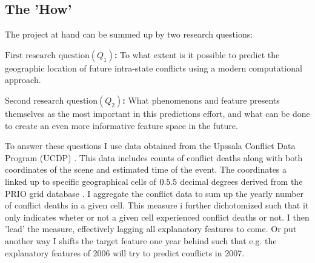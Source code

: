 \documentclass[a4paper]{article}
\begin{document}



\subsection{The 'How'}

The project at hand can be summed up by two research questions:\par

\textbf{$\textrm{First research question} (Q_{1})$:} To what extent is it possible to predict the geographic location of future intra-state conflicts using a modern computational approach. \par
\textbf{$\textrm{Second research question} (Q_{2})$:} What phenomenons and feature presents themselves as the most important in this predictions effort, and what can be done to create an even more informative feature space in the future.\par

To answer these questions I use data obtained from the Upssala Conflict Data Program (UCDP) \citep{Sundberg_2013, Croicu_Sundberg_2017}. This data includes counts of conflict deaths along with both coordinates of the scene and estimated time of the event. The coordinates a linked up to specific geographical cells of $0.5\time0.5$ decimal degrees derived from the PRIO grid database \citep{Tollefsen_2012}. I aggregate the conflict data to sum up the yearly number of conflict deaths in a given cell. This measure i further dichotomized such that it only indicates wheter or not a given cell experienced conflict deaths or not. I then 'lead' the measure, effectively lagging all explanatory features to come. Or put another way I shifts the target feature one year behind such that e.g. the explanatory features of 2006 will try to predict conflicts in 2007.\par
\end{document}
